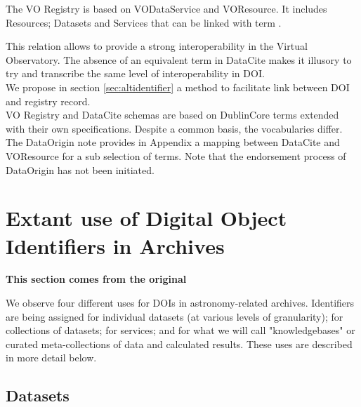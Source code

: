 \documentclass[11pt,a4paper]{ivoa}
\newcommand{\dataciteterm}[1]{\colorbox{lightgray}{DataCite:\textbf{#1}}}
\begin{document}
 The VO Registry is  based on VODataService and VOResource. It includes Resources; Datasets and Services that can be linked with term . 
 
 This relation allows to provide a strong interoperability in the Virtual Observatory. The absence of an equivalent term in DataCite makes it illusory to try and transcribe the same level of interoperability in DOI.\\
 
 
 
 We propose in section \ref{sec:altidentifier} a method to facilitate link between DOI and registry record.\\
 
VO Registry and DataCite schemas are based on DublinCore terms extended with their own specifications. Despite a common basis, the vocabularies differ. 
The DataOrigin note provides in Appendix a mapping between DataCite and VOResource for a sub selection of terms. Note that the endorsement process of DataOrigin has not been initiated.
 
 
\section{Extant use of Digital Object Identiﬁers in Archives}
\textbf{\color{red} This section comes from the original}

\label{sec:usage}
We observe four different uses for DOIs in astronomy-related archives.
Identifiers are being assigned for individual datasets (at various levels of granularity); for collections of datasets; for services; and for what we will call "knowledgebases" or curated meta-collections of data and calculated results. 
These uses are described in more detail below.

\subsection{Datasets}
\label{sec:intro:datasets}
\end{document}
